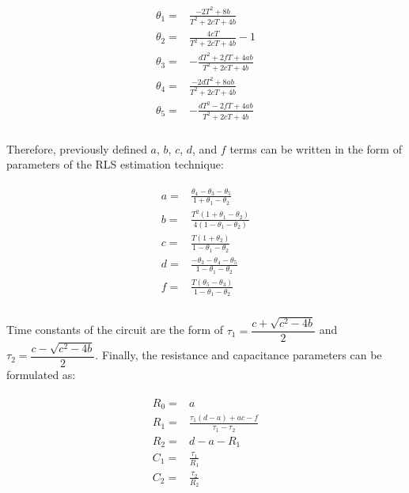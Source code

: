 \documentclass[12pt]{article}
\begin{document}
\begin{appendices}
\begin{align}
	\label{eqn:RLS_Parameters_with_RC_2}
	\begin{split}
		\theta_{1} =& \frac{-2T^{2} + 8b}{T^{2} + 2cT + 4b}\\
		\theta_{2} =& \frac{4cT}{T^{2} + 2cT + 4b} - 1 \\
		\theta_{3} =& -\frac{dT^{2}+2fT + 4ab}{T^{2} + 2cT + 4b}\\
		\theta_{4} =& \frac{-2dT^{2}+8ab}{T^{2} + 2cT + 4b} \\
		\theta_{5} =& -\frac{dT^{2}-2fT+4ab}{T^{2} + 2cT + 4b} \\ 
	\end{split}
\end{align}

\noindent Therefore, previously defined $a$, $b$, $c$, $d$, and $f$ terms 
can be written in the form of parameters of the RLS estimation technique:

\begin{align}
	\label{eqn:RLS_Letters_with_RLS_Parameters}
	\begin{split}
		a =& \frac{\theta_{4}-\theta_{3}-\theta_{5}}{1+\theta_{1}-\theta_{2}} \\
		b =& \frac{T^{2}(1+\theta_{1}-\theta_{2})}{4(1-\theta_{1}-\theta_{2})} \\
		c =& \frac{T(1+\theta_{2})}{1-\theta_{1}-\theta_{2}} \\
		d =& \frac{-\theta_{3}-\theta_{4}-\theta_{5}}{1-\theta_{1}-\theta_{2}} \\
		f =& \frac{T(\theta_{5}-\theta_{3})}{1-\theta_{1}-\theta_{2}} \\
	\end{split}
\end{align}

\noindent Time constants of the circuit are the form of $\tau_{1}=\dfrac{c+\sqrt{c^2-4b}}{2}$ and $\tau_{2}=\dfrac{c-\sqrt{c^2-4b}}{2}$. Finally, the resistance and capacitance parameters can be formulated as:
\end{appendices}

\begin{align}
	\label{eqn:RLS_RC_Values_with_Letters}
	\begin{split}
		R_{0} =& a\\
		R_{1} =& \frac{\tau_{1}(d-a)+ac-f}{\tau_{1}-\tau_{2}}\\
		R_{2} =& d - a - R_{1}\\
		C_{1} =& \frac{\tau_{1}}{R_{1}}\\
		C_{2} =& \frac{\tau_{2}}{R_{2}} \\
	\end{split}
\end{align}
\end{document}
